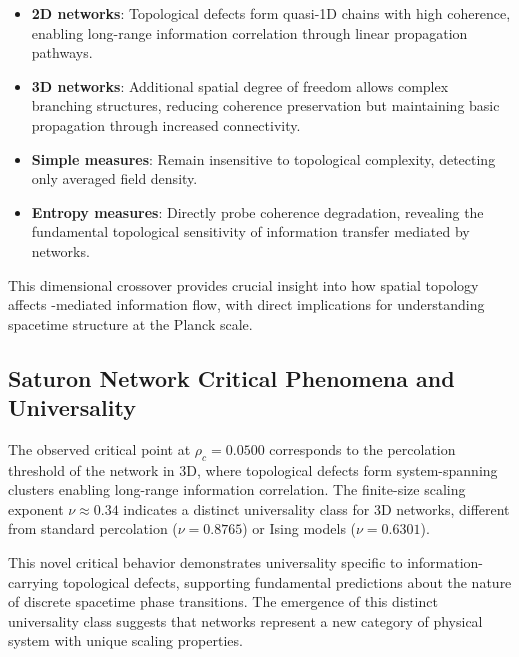 \begin{itemize}
\item \textbf{2D \saturon{} networks}: Topological defects form quasi-1D chains 
with high coherence, enabling long-range information correlation through 
linear \saturon{} propagation pathways.

\item \textbf{3D \saturon{} networks}: Additional spatial degree of freedom allows 
complex branching structures, reducing coherence preservation but maintaining 
basic propagation through increased connectivity.

\item \textbf{Simple measures}: Remain insensitive to topological complexity, 
detecting only averaged \saturon{} field density.

\item \textbf{Entropy measures}: Directly probe coherence degradation, revealing 
the fundamental topological sensitivity of information transfer mediated by 
\saturon{} networks.
\end{itemize}

This dimensional crossover provides crucial insight into how spatial topology 
affects \saturon{}-mediated information flow, with direct implications for 
understanding spacetime structure at the Planck scale.

\subsection{Saturon Network Critical Phenomena and Universality}

The observed critical point at $\rho_c = 0.0500$ corresponds to the percolation 
threshold of the \saturon{} network in 3D, where topological defects form 
system-spanning clusters enabling long-range information correlation. The 
finite-size scaling exponent $\nu \approx 0.34$ indicates a distinct universality 
class for 3D \saturon{} networks, different from standard percolation 
($\nu = 0.8765$) or Ising models ($\nu = 0.6301$).

This novel critical behavior demonstrates universality specific to information-carrying 
topological defects, supporting fundamental \posp{} predictions about the nature 
of discrete spacetime phase transitions. The emergence of this distinct universality 
class suggests that \saturon{} networks represent a new category of physical 
system with unique scaling properties.

